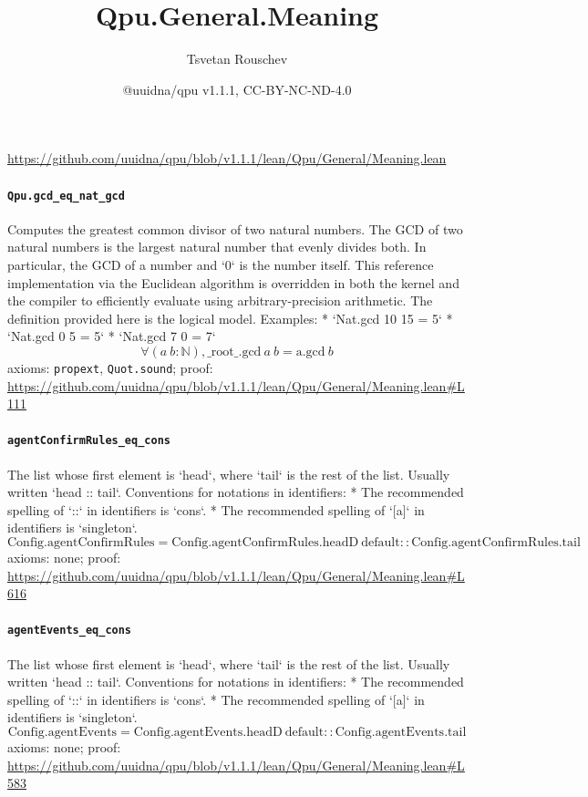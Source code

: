 \documentclass[11pt]{article}
\title{Qpu.General.Meaning}
\author{Tsvetan Rouschev}
\date{@uuidna/qpu v1.1.1, CC-BY-NC-ND-4.0}
\begin{document}
\maketitle
\noindent\url{https://github.com/uuidna/qpu/blob/v1.1.1/lean/Qpu/General/Meaning.lean}

\paragraph{\texttt{Qpu.gcd\_eq\_nat\_gcd}}
Computes the greatest common divisor of two natural numbers. The GCD of two natural numbers is the largest natural number that evenly divides both.  In particular, the GCD of a number and `0` is the number itself.  This reference implementation via the Euclidean algorithm is overridden in both the kernel and the compiler to efficiently evaluate using arbitrary-precision arithmetic. The definition provided here is the logical model.  Examples: * `Nat.gcd 10 15 = 5` * `Nat.gcd 0 5 = 5` * `Nat.gcd 7 0 = 7`
\[ \forall (a\ b : \mathbb{N}), \mathrm{\_root\_.gcd}\ a\ b = \mathrm{a.gcd}\ b \]
\noindent axioms: \texttt{propext}, \texttt{Quot.sound}; proof: \url{https://github.com/uuidna/qpu/blob/v1.1.1/lean/Qpu/General/Meaning.lean\#L111}

\paragraph{\texttt{agentConfirmRules\_eq\_cons}}
The list whose first element is `head`, where `tail` is the rest of the list. Usually written `head :: tail`.   Conventions for notations in identifiers:   * The recommended spelling of `::` in identifiers is `cons`.   * The recommended spelling of `[a]` in identifiers is `singleton`.
\[ \mathrm{Config.agentConfirmRules} = \mathrm{Config.agentConfirmRules.headD}\ \mathrm{default} :: \mathrm{Config.agentConfirmRules.tail} \]
\noindent axioms: none; proof: \url{https://github.com/uuidna/qpu/blob/v1.1.1/lean/Qpu/General/Meaning.lean\#L616}

\paragraph{\texttt{agentEvents\_eq\_cons}}
The list whose first element is `head`, where `tail` is the rest of the list. Usually written `head :: tail`.   Conventions for notations in identifiers:   * The recommended spelling of `::` in identifiers is `cons`.   * The recommended spelling of `[a]` in identifiers is `singleton`.
\[ \mathrm{Config.agentEvents} = \mathrm{Config.agentEvents.headD}\ \mathrm{default} :: \mathrm{Config.agentEvents.tail} \]
\noindent axioms: none; proof: \url{https://github.com/uuidna/qpu/blob/v1.1.1/lean/Qpu/General/Meaning.lean\#L583}
\end{document}

